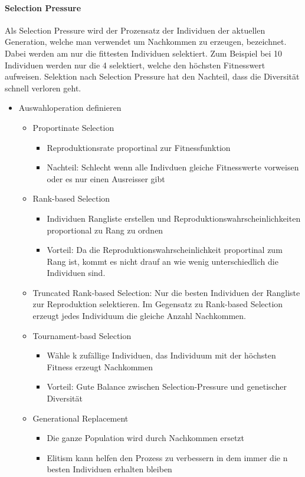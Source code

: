       \paragraph{Selection Pressure}
        Als Selection Pressure wird der Prozensatz der Individuen der aktuellen Generation, welche man verwendet um Nachkommen zu erzeugen, bezeichnet.
        Dabei werden am nur die fittesten Individuen selektiert. Zum Beispiel bei 10 Individuen werden nur die 4 selektiert, welche den höchsten Fitnesswert aufweisen.
        Selektion nach Selection Pressure hat den Nachteil, dass die Diversität schnell verloren geht.

    \begin{itemize}

      \item Auswahloperation definieren
        \begin{itemize}
          \item Proportinate Selection
            \begin{itemize}
              \item Reproduktionsrate proportinal zur Fitnessfunktion
              \item Nachteil: Schlecht wenn alle Indivduen gleiche Fitnesswerte vorweisen oder es nur einen Ausreisser gibt
            \end{itemize}
          \item Rank-based Selection
            \begin{itemize}
              \item Individuen Rangliste erstellen und Reproduktionswahrscheinlichkeiten proportional zu Rang zu ordnen
              \item Vorteil: Da die Reproduktionswahrscheinlichkeit proportinal zum Rang ist, kommt es nicht drauf an wie wenig unterschiedlich die Individuen sind.
            \end{itemize}
          \item Truncated Rank-based Selection: Nur die besten Individuen der Rangliste zur Reproduktion selektieren. Im Gegensatz zu Rank-based Selection erzeugt jedes Individuum die gleiche Anzahl Nachkommen.
          \item Tournament-basd Selection
            \begin{itemize}
              \item Wähle k zufällige Individuen, das Individuum mit der höchsten Fitness erzeugt Nachkommen
              \item Vorteil: Gute Balance zwischen Selection-Pressure und genetischer Diversität
            \end{itemize}
          \item Generational Replacement
            \begin{itemize}
              \item Die ganze Population wird durch Nachkommen ersetzt
              \item Elitism kann helfen den Prozess zu verbessern in dem immer die n besten Individuen erhalten bleiben
            \end{itemize}



\end{itemize}
\end{itemize}
